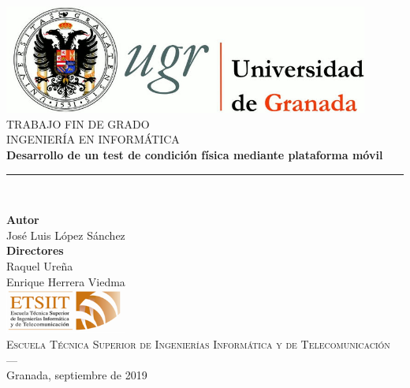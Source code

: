 \begin{titlepage}
 
 
\newlength{\centeroffset}
\setlength{\centeroffset}{-0.5\oddsidemargin}
\addtolength{\centeroffset}{0.5\evensidemargin}
\thispagestyle{empty}

\noindent\hspace*{\centeroffset}\begin{minipage}{\textwidth}

\centering
\includegraphics[width=0.9\textwidth]{imagenes/logo_ugr.jpg}\\[1cm]

\textsc{ \Large TRABAJO FIN DE GRADO\\[0.2cm]}
\textsc{ INGENIERÍA EN INFORMÁTICA}\\[1.4cm]
% 
{\Huge\bfseries Desarrollo de un test de condición física mediante plataforma móvil\\
}
\noindent\rule[-1ex]{\textwidth}{3pt}\\[3.5ex]
\end{minipage}

\vspace{2cm}
\noindent\hspace*{\centeroffset}\begin{minipage}{\textwidth}
\centering

\textbf{Autor}\\ {José Luis López Sánchez}\\[2.5ex]
\textbf{Directores}\\
{Raquel Ureña\\
Enrique Herrera Viedma}\\[2cm]
\includegraphics[width=0.3\textwidth]{imagenes/etsiit_logo.png}\\[0.1cm]
\textsc{Escuela Técnica Superior de Ingenierías Informática y de Telecomunicación}\\
\textsc{---}\\
Granada, septiembre de 2019
\end{minipage}
\end{titlepage}


